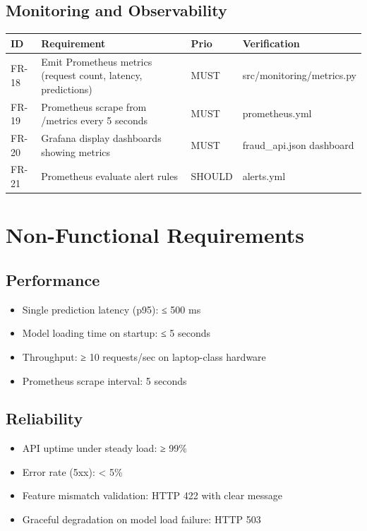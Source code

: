 \documentclass[12pt,a4paper]{article}
\begin{document}
\subsection{Monitoring and Observability}

\begin{longtable}{|p{0.6cm}|p{3cm}|p{2cm}|p{3.5cm}|}
\hline
\textbf{ID} & \textbf{Requirement} & \textbf{Prio} & \textbf{Verification} \\
\hline
FR-18 & Emit Prometheus metrics (request count, latency, predictions) & MUST & src/monitoring/metrics.py \\
FR-19 & Prometheus scrape from /metrics every 5 seconds & MUST & prometheus.yml \\
FR-20 & Grafana display dashboards showing metrics & MUST & fraud\_api.json dashboard \\
FR-21 & Prometheus evaluate alert rules & SHOULD & alerts.yml \\
\hline
\end{longtable}

\section{Non-Functional Requirements}

\subsection{Performance}
\begin{itemize}
    \item Single prediction latency (p95): ≤ 500 ms
    \item Model loading time on startup: ≤ 5 seconds
    \item Throughput: ≥ 10 requests/sec on laptop-class hardware
    \item Prometheus scrape interval: 5 seconds
\end{itemize}

\subsection{Reliability}
\begin{itemize}
    \item API uptime under steady load: ≥ 99\%
    \item Error rate (5xx): < 5\%
    \item Feature mismatch validation: HTTP 422 with clear message
    \item Graceful degradation on model load failure: HTTP 503
\end{itemize}
\end{document}
